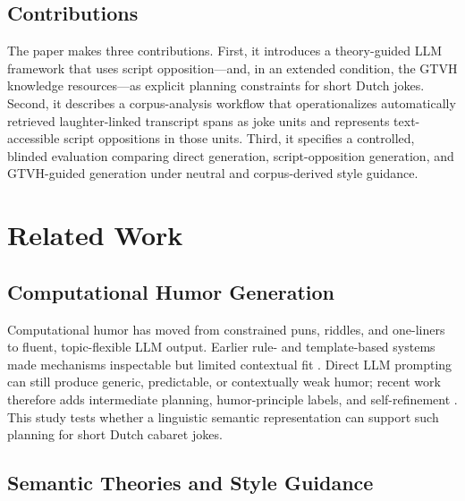 \documentclass[11pt]{article}
\begin{document}
\subsection{Contributions}\label{contributions}

The paper makes three contributions. First, it introduces a theory-guided LLM framework that uses script opposition---and, in an extended condition, the GTVH knowledge resources---as explicit planning constraints for short Dutch jokes. Second, it describes a corpus-analysis workflow that operationalizes automatically retrieved laughter-linked transcript spans as joke units and represents text-accessible script oppositions in those units. Third, it specifies a controlled, blinded evaluation comparing direct generation, script-opposition generation, and GTVH-guided generation under neutral and corpus-derived style guidance.

\section{Related Work}\label{related-work}

\subsection{Computational Humor Generation}\label{computational-humor-generation}

Computational humor has moved from constrained puns, riddles, and one-liners to fluent, topic-flexible LLM output. Earlier rule- and template-based systems made mechanisms inspectable but limited contextual fit \citep{ritchie2009,amin2020survey}. Direct LLM prompting can still produce generic, predictable, or contextually weak humor; recent work therefore adds intermediate planning, humor-principle labels, and self-refinement \citep{tian2022pun,tikhonov2024humor}. This study tests whether a linguistic semantic representation can support such planning for short Dutch cabaret jokes.

\subsection{Semantic Theories and Style Guidance}\label{semantic-theories-and-style-guidance}
\end{document}
